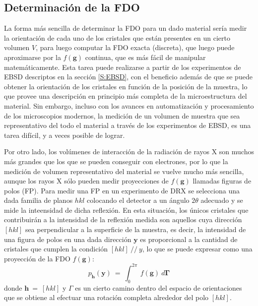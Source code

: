 \subsection{Determinación de la FDO}\label{SS:FDO}
La forma más sencilla de determinar la FDO para un dado material sería medir la orientación de cada uno de los cristales que están presentes en un cierto volumen $V$, para luego computar la FDO exacta (discreta), que luego puede aproximarse por la $f(\mathbf{g})$ continua, que es más fácil de manipular matemáticamente.
Esta tarea puede realizarse a partir de los experimentos de EBSD descriptos en la sección \ref{S:EBSD}, con el beneficio además de que se puede obtener la orientación de los cristales en función de la posición de la muestra, lo que provee una descripción en principio más completa de la microestructura del material.
Sin embargo, incluso con los avances en automatización y procesamiento de los microscopios modernos, la medición de un volumen de muestra que sea representativo del todo el material a través de los experimentos de EBSD, es una tarea difícil, y a veces posible de lograr.

Por otro lado, los volúmenes de interacción de la radiación de rayos X son muchos más grandes que los que se pueden conseguir con electrones, por lo que la medición de volumen representativo del material se vuelve mucho más sencilla, aunque los rayos X sólo pueden medir proyecciones de $f(\mathbf{g})$ llamadas figuras de polos (FP).
Para medir una FP en un experimento de DRX se selecciona una dada familia de planos ${hkl}$ colocando el detector a un ángulo $2\theta$ adecuado y se mide la inteensidad de dicha reflexión.
En esta situación, los únicos cristales que contribuirán a la intensidad de la reflexión medida son aquellos cuya dirección $[hkl]$ sea perpendicular a la superficie de la muestra, es decir, la intensidad de una figura de polos en una dada dirección $\mathbf{y}$ es proporcional a la cantidad de cristales que cumplen la condición $[hkl] \ // \ y$, lo que se puede expresar como una proyección de la FDO $f(\mathbf{g})$:
\begin{equation}
  p_{\mathbf{h}}(\mathbf{y}) \ = \ \int_{0}^{2\pi} \ f(\mathbf{g}) \ d\mathbf{\Gamma}
  \label{eq:PDF}
\end{equation}
\noindent
donde $\mathbf{h} \ = \ [hkl]$ y $\Gamma$ es un cierto camino dentro del espacio de orientaciones que se obtiene al efectuar una rotación completa alrededor del polo $[hkl]$.


